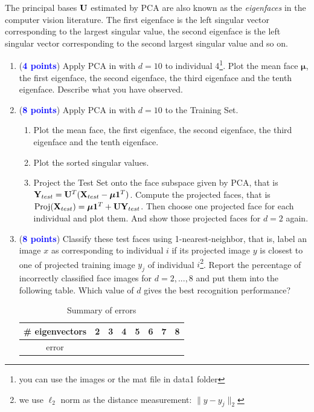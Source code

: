 \documentclass[english,onecolumn]{IEEEtran}
\newcommand{\bY}{{\bf Y}}
\newcommand{\bX}{{\bf X}}
\newcommand{\bmu}{{\boldsymbol \mu}}
\newcommand{\bone}{{\boldsymbol 1}}
\newcommand{\bU}{{\bf U}}
\begin{document}
The principal bases $\bU$ estimated by PCA are also known as the \textit{eigenfaces} in the computer vision literature. The first eigenface is the left singular vector corresponding to the largest singular value, the second eigenface is the left singular vector corresponding to the second largest singular value and so on.

\begin{enumerate}
    \item (\textcolor{blue}{\textbf{4 points}}) Apply PCA in  with $d = 10$ to individual 4\footnote{you can use the images or the mat file in data1 folder}. Plot the mean face $\bmu$, the first eigenface, the second eigenface, the third eigenface and the tenth eigenface. Describe what you have observed.
    \item (\textcolor{blue}{\textbf{8 points}}) Apply PCA in  with $d = 10$ to the Training Set. 
    \begin{enumerate}
        \item Plot the mean face, the first eigenface, the second eigenface, the third eigenface and the tenth eigenface.
        \item Plot the sorted singular values.
        \item Project the Test Set onto the face subspace given by PCA, that is $\bY_{test} = \bU^T(\bX_{test}-\bmu \bone^T)$. Compute the projected faces, that is $\text{Proj}(\bX_{test}) = \bmu \bone^T + \bU\bY_{test}$. Then choose one projected face for each individual and plot them. And show those projected faces for $d = 2$ again.
    \end{enumerate} 
    \item (\textcolor{blue}{\textbf{8 points}}) Classify these test faces using 1-nearest-neighbor, that is, label an image $x$ as corresponding to individual $i$ if its projected image $y$ is closest to one of projected training image $y_j$ of individual $i$\footnote{we use $\ell_2$ norm as the distance measurement: $ \|y-y_j\|_2$}. Report the percentage of incorrectly classified face images for $d = 2,...,8$ and put them into the following table. Which value of $d$ gives the best recognition performance?
    \begin{table}[h]
        \centering
        \caption{Summary of errors}
        \begin{tabular}{c|c|c|c|c|c|c|c}
        \# eigenvectors& 2 & 3& 4 & 5 & 6 & 7 & 8 \\ 
        \hline
            error &  &  &  &  &  &  &  
        \end{tabular}
        \label{tab:my_label}
    \end{table}
\end{enumerate}
\end{document}
